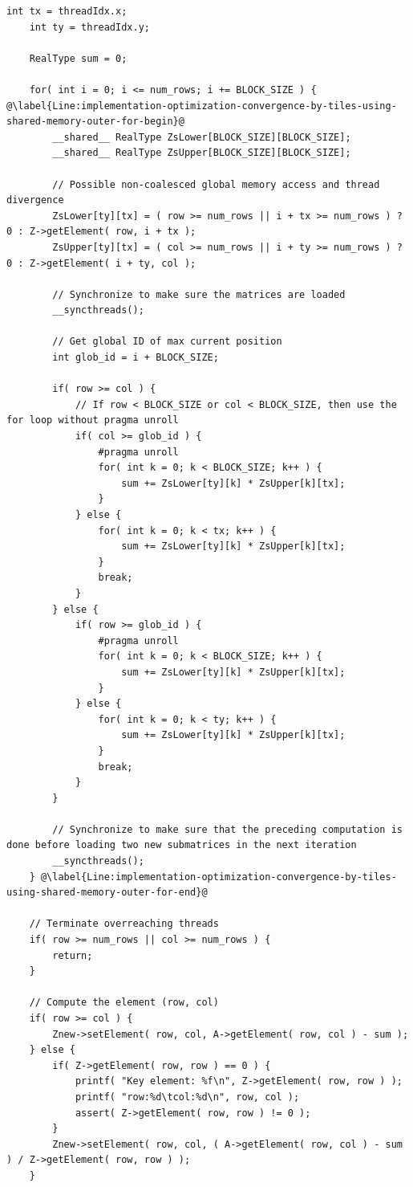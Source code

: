 \begin{lstlisting}[caption={Calculation of a single iteration of the GPU Iterative Crout method using logic from Listing~\ref{Listing:CUDA-matrix-multiplication-with-shared-memory-example}. Taken from the Decomposition project repository on GitLab\protect\footref{Footnote:decomposition-project-gitlab-url}.},label={Listing:implementation-optimization-convergence-by-tiles-using-shared-memory},escapechar=@]
	int tx = threadIdx.x;
	int ty = threadIdx.y;
	
	RealType sum = 0;
	
	for( int i = 0; i <= num_rows; i += BLOCK_SIZE ) { @\label{Line:implementation-optimization-convergence-by-tiles-using-shared-memory-outer-for-begin}@
		__shared__ RealType ZsLower[BLOCK_SIZE][BLOCK_SIZE];
		__shared__ RealType ZsUpper[BLOCK_SIZE][BLOCK_SIZE];
		
		// Possible non-coalesced global memory access and thread divergence
		ZsLower[ty][tx] = ( row >= num_rows || i + tx >= num_rows ) ? 0 : Z->getElement( row, i + tx );
		ZsUpper[ty][tx] = ( col >= num_rows || i + ty >= num_rows ) ? 0 : Z->getElement( i + ty, col );
		
		// Synchronize to make sure the matrices are loaded
		__syncthreads();
		
		// Get global ID of max current position
		int glob_id = i + BLOCK_SIZE;
		
		if( row >= col ) {
			// If row < BLOCK_SIZE or col < BLOCK_SIZE, then use the for loop without pragma unroll
			if( col >= glob_id ) {
				#pragma unroll
				for( int k = 0; k < BLOCK_SIZE; k++ ) {
					sum += ZsLower[ty][k] * ZsUpper[k][tx];
				}
			} else {
				for( int k = 0; k < tx; k++ ) {
					sum += ZsLower[ty][k] * ZsUpper[k][tx];
				}
				break;
			}
		} else {
			if( row >= glob_id ) {
				#pragma unroll
				for( int k = 0; k < BLOCK_SIZE; k++ ) {
					sum += ZsLower[ty][k] * ZsUpper[k][tx];
				}
			} else {
				for( int k = 0; k < ty; k++ ) {
					sum += ZsLower[ty][k] * ZsUpper[k][tx];
				}
				break;
			}
		}
		
		// Synchronize to make sure that the preceding computation is done before loading two new submatrices in the next iteration
		__syncthreads();
	} @\label{Line:implementation-optimization-convergence-by-tiles-using-shared-memory-outer-for-end}@

	// Terminate overreaching threads
	if( row >= num_rows || col >= num_rows ) {
		return;
	}
	
	// Compute the element (row, col)
	if( row >= col ) {
		Znew->setElement( row, col, A->getElement( row, col ) - sum );
	} else {
		if( Z->getElement( row, row ) == 0 ) {
			printf( "Key element: %f\n", Z->getElement( row, row ) );
			printf( "row:%d\tcol:%d\n", row, col );
			assert( Z->getElement( row, row ) != 0 );
		}
		Znew->setElement( row, col, ( A->getElement( row, col ) - sum ) / Z->getElement( row, row ) );
	}
\end{lstlisting}

